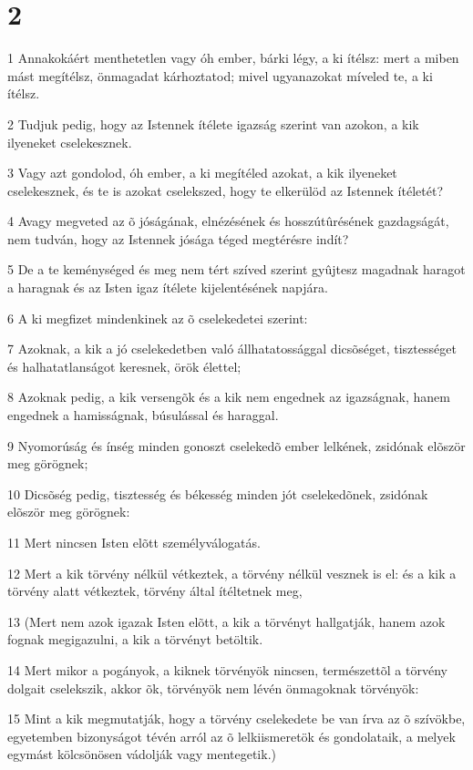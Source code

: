 \chapter{2}

\par 1 Annakokáért menthetetlen vagy óh ember, bárki légy, a ki ítélsz: mert a miben mást megítélsz, önmagadat kárhoztatod; mivel ugyanazokat míveled te, a ki ítélsz.
\par 2 Tudjuk pedig, hogy az Istennek ítélete igazság szerint van azokon, a kik ilyeneket cselekesznek.
\par 3 Vagy azt gondolod, óh ember, a ki megítéled azokat, a kik ilyeneket cselekesznek, és te is azokat cselekszed, hogy te elkerülöd az Istennek ítéletét?
\par 4 Avagy megveted az õ jóságának, elnézésének és hosszútûrésének gazdagságát, nem tudván, hogy az Istennek jósága téged megtérésre indít?
\par 5 De a te keménységed és meg nem tért szíved szerint gyûjtesz magadnak haragot a haragnak és az Isten igaz ítélete kijelentésének napjára.
\par 6 A ki megfizet mindenkinek az õ cselekedetei szerint:
\par 7 Azoknak, a kik a jó cselekedetben való állhatatossággal dicsõséget, tisztességet és halhatatlanságot keresnek, örök élettel;
\par 8 Azoknak pedig, a kik versengõk és a kik nem engednek az igazságnak, hanem engednek a hamisságnak, búsulással és haraggal.
\par 9 Nyomorúság és ínség minden gonoszt cselekedõ ember lelkének, zsidónak elõször meg görögnek;
\par 10 Dicsõség pedig, tisztesség és békesség minden jót cselekedõnek, zsidónak elõször meg görögnek:
\par 11 Mert nincsen Isten elõtt személyválogatás.
\par 12 Mert a kik törvény nélkül vétkeztek, a törvény nélkül vesznek is el: és a kik a törvény alatt vétkeztek, törvény által ítéltetnek meg,
\par 13 (Mert nem azok igazak Isten elõtt, a kik a törvényt hallgatják, hanem azok fognak megigazulni, a kik a törvényt betöltik.
\par 14 Mert mikor a pogányok, a kiknek törvényök nincsen, természettõl a törvény dolgait cselekszik, akkor õk, törvényök nem lévén önmagoknak törvényök:
\par 15 Mint a kik megmutatják, hogy a törvény cselekedete be van írva az õ szívökbe, egyetemben bizonyságot tévén arról az õ lelkiismeretök és gondolataik, a melyek egymást kölcsönösen vádolják vagy mentegetik.)
